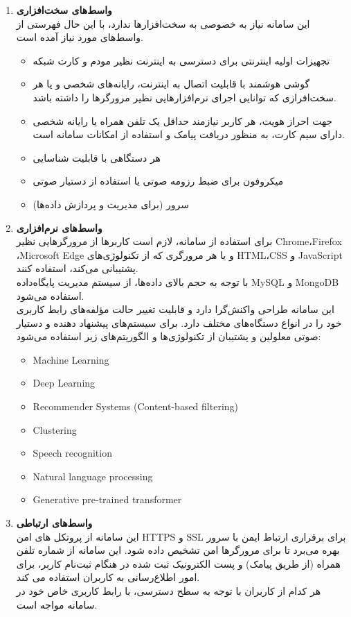 \documentclass[12pt]{article}
\begin{document}
\begin{enumerate}
		\item
		\textbf{واسط‌های سخت‌افزاری}\\
		این سامانه نیاز به ‌خصوصی به سخت‌افزار‌ها ندارد، با این حال فهرستی از واسط‌های مورد نیاز آمده است.
		\begin{itemize}
			\item
			تجهیزات اولیه اینترنتی برای دسترسی به اینترنت نظیر مودم و کارت شبکه
			\item
			گوشی هوشمند با قابلیت اتصال به اینترنت، رایانه‌های شخصی و یا هر سخت‌افرازی که توانایی اجرای نرم‌افزارهایی نظیر مرورگرها را داشته باشد.
			\item
			جهت احراز هویت، هر کاربر نیازمند حداقل یک تلفن همراه یا رایانه شخصی دارای سیم کارت، به منظور دریافت پیامک و استفاده از امکانات سامانه است.
			\item
			هر دستگاهی با قابلیت شناسایی 
			\item
			میکروفون برای ضبط رزومه صوتی یا استفاده از دستیار صوتی
			\item
			سرور (برای مدیریت و پردازش داده‌ها)
		\end{itemize}

		\item
		\label{vaset-nrm}\textbf{واسط‌های نرم‌افزاری}\\
		برای استفاده از سامانه،‌ لازم است کاربرها از مرورگر‌هایی نظیر Chrome،Firefox ،Microsoft Edge و یا هر مرورگری که از تکنولوژی‌های HTML،CSS  و JavaScript پشتیبانی می‌کند،‌ استفاده کنند.\\
		با توجه به حجم بالای داده‌ها، از سیستم مدیریت پایگاه‌داده MySQL و MongoDB استفاده می‌شود.\\
		این سامانه طراحی واکنش‌گرا دارد و قابلیت تغییر حالت مؤلفه‌های رابط کاربری خود را در انواع دستگاه‌های مختلف دارد. برای سیستم‌های پیشنهاد دهنده و دستیار صوتی معلولین و پشتیبان از تکنولوژی‌ها و الگوریتم‌های زیر استفاده می‌شود:
		\begin{itemize}
			\item
			Machine Learning
			\item
			Deep Learning
			\item
			Recommender Systems (Content-based filtering)
			\item
			Clustering
			\item
			Speech recognition
			\item
			Natural language processing
			\item
			Generative pre-trained transformer
		\end{itemize}

		\item
		\textbf{واسط‌های ارتباطی}\\
		این سامانه از پروتکل های امن HTTPS و SSL برای برقراری ارتباط ایمن با سرور بهره می‌برد تا برای مرورگرها امن تشخیص داده شود. این سامانه از شماره تلفن همراه (از طریق پیامک) و پست الکترونیک ثبت شده در هنگام ثبت‌نام کاربر، برای امور اطلاع‌‌رسانی به کاربران استفاده می کند.\\
		هر کدام از کاربران با توجه به سطح دسترسی، با رابط کاربری خاص خود در سامانه مواجه است.


\end{enumerate}
\end{document}
